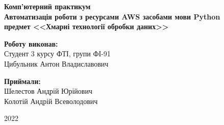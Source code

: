 \begin{titlepage}
    \vspace{13em}
    
    \begin{center}
        \begin{spacing}{1.5}
            \textbf{\Large{Комп'ютерний практикум }} \\
            \vspace{1cm}\textbf{\Large{Автоматизація роботи з ресурсами AWS \linebreak засобами мови Python}} \\ 
            \vspace{1cm}\textbf{\large{предмет <<Хмарні технології обробки даних>>}}
        \end{spacing}
    \end{center}

    \vspace{13em}

    \newlength{\maxname}

    \hfill\parbox{\maxname}{
        \begin{spacing}{1.1}
            \small{\textbf{Роботу виконав:}} \\ 
            \small{Студент 3 курсу ФТІ, групи ФІ-91} \\
            \small{Цибульник Антон Владиславович} \\
        \end{spacing}
    }
         
    \hfill\parbox{\maxname}{
        \begin{spacing}{1.1}
            \small{\textbf{Приймали:}} \\ 
            \small{Шелестов Андрій Юрійович} \\
            \small{Колотій Андрій Всеволодович} \\
        \end{spacing}
    }

    \vspace{\fill}
    
    \begin{center}
        \small{2022}
    \end{center}
    
\end{titlepage}